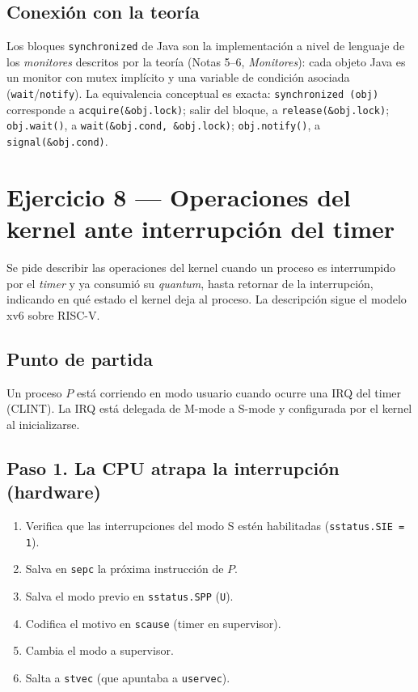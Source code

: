 \documentclass[11pt,a4paper]{article}
\begin{document}
\subsection*{Conexión con la teoría}

Los bloques \texttt{synchronized} de Java son la implementación a nivel
de lenguaje de los \emph{monitores} descritos por la teoría
(Notas 5--6, \emph{Monitores}): cada objeto Java es un monitor con
mutex implícito y una variable de condición asociada
(\texttt{wait}/\texttt{notify}). La equivalencia conceptual es exacta:
\texttt{synchronized (obj)} corresponde a \texttt{acquire(\&obj.lock)};
salir del bloque, a \texttt{release(\&obj.lock)};
\texttt{obj.wait()}, a \texttt{wait(\&obj.cond, \&obj.lock)};
\texttt{obj.notify()}, a \texttt{signal(\&obj.cond)}.

\section{Ejercicio 8 --- Operaciones del kernel ante interrupción del timer}

Se pide describir las operaciones del kernel cuando un proceso es
interrumpido por el \emph{timer} y ya consumió su \emph{quantum},
hasta retornar de la interrupción, indicando en qué estado el kernel
deja al proceso. La descripción sigue el modelo xv6 sobre RISC-V.

\subsection*{Punto de partida}

Un proceso $P$ está corriendo en modo usuario cuando ocurre una IRQ
del timer (CLINT). La IRQ está delegada de M-mode a S-mode y
configurada por el kernel al inicializarse.

\subsection*{Paso 1. La CPU atrapa la interrupción (hardware)}

\begin{enumerate}[leftmargin=*,nosep]
    \item Verifica que las interrupciones del modo S estén habilitadas
        (\texttt{sstatus.SIE = 1}).
    \item Salva en \texttt{sepc} la próxima instrucción de $P$.
    \item Salva el modo previo en \texttt{sstatus.SPP} (\texttt{U}).
    \item Codifica el motivo en \texttt{scause} (timer en supervisor).
    \item Cambia el modo a supervisor.
    \item Salta a \texttt{stvec} (que apuntaba a \texttt{uservec}).
\end{enumerate}
\end{document}
